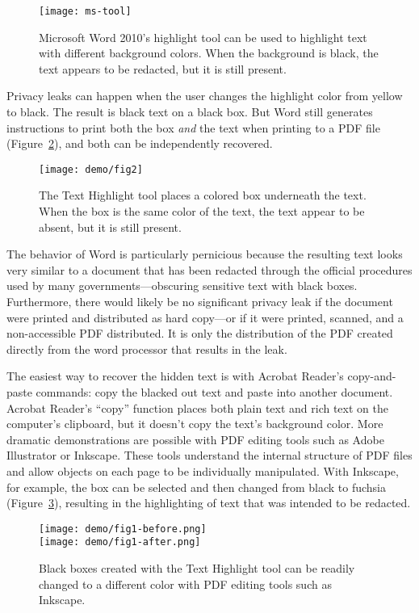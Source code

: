 \documentclass{article}
\begin{document}
\begin{figure}
\texttt{[image: ms-tool]}
\caption{Microsoft Word 2010's highlight tool can be used to highlight
  text with different background colors. When the background is
  black, the text appears to be redacted, but it is still present.}\label{ms-tool}
\end{figure}

Privacy leaks can happen when
the user changes the highlight color from yellow to black. The result
is black text on a black box.  But Word still generates
instructions to print both the  box \emph{and} the 
text when printing to a PDF file (Figure~\ref{demo1}), and both can be
independently recovered. 

\begin{figure}
\texttt{[image: demo/fig2]}
\caption{The Text Highlight tool places a colored box underneath the
  text. When the box is the same color of the text, the text appear to
  be absent, but it is still present.}\label{demo1}
\end{figure}

The behavior of Word is particularly pernicious because the resulting
text looks very similar to a document that has been redacted through
the official procedures used by many governments---obscuring sensitive
text with black boxes. Furthermore, there would likely be no
significant privacy leak if the document were printed and
distributed as hard copy---or if it were printed, scanned, and a non-accessible PDF
distributed. It is only the distribution of the PDF created directly
from the word processor that results in the leak.

The easiest way to recover the hidden text is with Acrobat Reader's
copy-and-paste commands:  copy the blacked out text and paste into
another document. Acrobat Reader's ``copy'' function places both plain text
and rich text on the computer's clipboard, but it doesn't copy the
text's background color. More dramatic demonstrations are possible
with PDF editing tools such as Adobe Illustrator or Inkscape. These tools understand the internal structure of PDF files
and allow objects on each page to be individually manipulated. With
Inkscape, for example, the box can be selected and then changed
from black to fuchsia (Figure~\ref{fuschia}), resulting in the highlighting of text that was intended to be
redacted. 

\begin{figure}
\texttt{[image: demo/fig1-before.png]}\\
\texttt{[image: demo/fig1-after.png]}
\caption{Black boxes created with the Text Highlight tool can be
  readily changed to a different color with PDF editing tools such as Inkscape.}\label{fuschia}
\end{figure}
\end{document}

